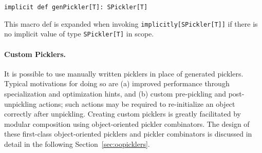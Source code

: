 \begin{lstlisting}
implicit def genPickler[T]: SPickler[T]
\end{lstlisting}

This macro def is expanded when invoking \newline
\verb|implicitly[SPickler[T]]| if
there is no implicit value of type \verb|SPickler[T]| in scope.


\paragraph{Custom Picklers.} It is possible to use manually written picklers
in place of generated picklers. Typical motivations for doing so are (a)
improved performance through specialization and optimization hints, and (b) custom pre-pickling and post-unpickling
actions; such actions may be required to re-initialize an object
correctly after unpickling. Creating custom picklers is greatly facilitated by
modular composition using object-oriented pickler combinators. The design of
these first-class object-oriented picklers and pickler combinators is
discussed in detail in the following Section~\ref{sec:oopicklers}.





